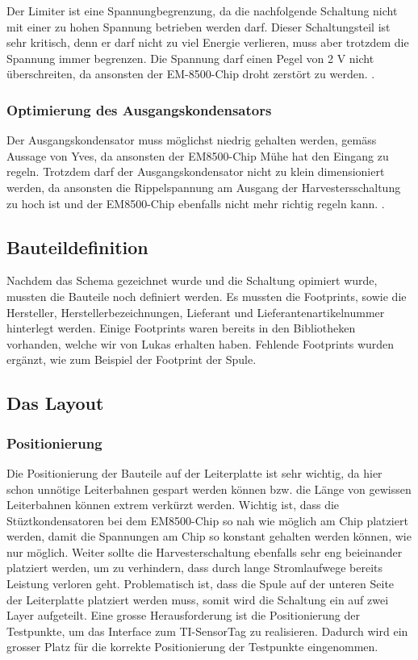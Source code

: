 Der Limiter ist eine Spannungbegrenzung, da die nachfolgende Schaltung nicht mit einer zu hohen Spannung betrieben werden darf. Dieser Schaltungsteil ist sehr kritisch, denn er darf nicht zu viel Energie verlieren, muss aber trotzdem die Spannung immer begrenzen. Die Spannung darf einen Pegel von 2 V nicht überschreiten, da ansonsten der EM-8500-Chip droht zerstört zu werden. 
.

\subsubsection{Optimierung des Ausgangskondensators}

Der Ausgangskondensator muss möglichst niedrig gehalten werden, gemäss Aussage von Yves, da ansonsten der EM8500-Chip Mühe hat den Eingang zu regeln. Trotzdem darf der Ausgangskondensator nicht zu klein dimensioniert werden, da ansonsten die Rippelspannung am Ausgang der Harvestersschaltung zu hoch ist und der EM8500-Chip ebenfalls nicht mehr richtig regeln kann.
.


\subsection{Bauteildefinition}

Nachdem das Schema gezeichnet wurde und die Schaltung opimiert wurde, mussten die Bauteile noch definiert werden. Es mussten die Footprints, sowie die Hersteller, Herstellerbezeichnungen, Lieferant und Lieferantenartikelnummer hinterlegt werden. Einige Footprints waren bereits in den Bibliotheken vorhanden, welche wir von Lukas erhalten haben. Fehlende Footprints wurden ergänzt, wie zum Beispiel der Footprint der Spule.


\subsection{Das Layout}

\subsubsection{Positionierung}
Die Positionierung der Bauteile auf der Leiterplatte ist sehr wichtig, da hier schon unnötige Leiterbahnen gespart werden können bzw. die Länge von gewissen Leiterbahnen können extrem verkürzt werden.
Wichtig ist, dass die Stüztkondensatoren bei dem EM8500-Chip so nah wie möglich am Chip platziert werden, damit die Spannungen am Chip so konstant gehalten werden können, wie nur möglich.
Weiter sollte die Harvesterschaltung ebenfalls sehr eng beieinander platziert werden, um zu verhindern, dass durch lange Stromlaufwege bereits Leistung verloren geht. Problematisch ist, dass die Spule auf der unteren Seite der Leiterplatte platziert werden muss, somit wird die Schaltung ein auf zwei Layer aufgeteilt.
Eine grosse Herausforderung ist die Positionierung der Testpunkte, um das Interface zum TI-SensorTag zu realisieren. Dadurch wird ein grosser Platz für die korrekte Positionierung der Testpunkte eingenommen.

